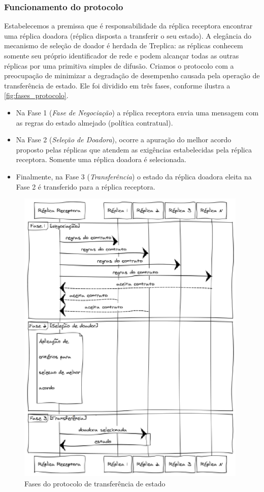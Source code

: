 \subsubsection{Funcionamento do protocolo}

Estabelecemos a premissa que é responsabilidade da réplica receptora encontrar uma réplica
doadora (réplica disposta a transferir o seu estado). A elegância do mecanismo de seleção
de doador é herdada de Treplica: as réplicas conhecem somente seu próprio identificador de
rede e podem alcançar todas as outras réplicas por uma primitiva simples de difusão.
Criamos o protocolo com a preocupação de minimizar a degradação de desempenho causada pela
operação de transferência de estado. Ele foi dividido em três fases, conforme ilustra a
\autoref{fig:fases_protocolo}.

\begin{itemize}
  \item Na Fase 1 (\emph{Fase de Negociação}) a réplica receptora envia uma mensagem com
    as regras do estado almejado (política contratual).
  \item Na Fase 2 (\emph{Seleção de Doadora}), ocorre a apuração do melhor acordo proposto
    pelas réplicas que atendem as exigências estabelecidas pela réplica receptora. Somente
    uma réplica doadora é selecionada.
  \item Finalmente, na Fase 3 (\emph{Transferência}) o estado da réplica doadora eleita na
    Fase 2 é transferido para a réplica receptora.
\end{itemize}

\begin{figure}[ht]
  \centering
  \includegraphics[width=11cm]{conteudo/capitulos/figuras/fases_protocolo.eps}
  \caption{Fases do protocolo de transferência de estado}
  \label{fig:fases_protocolo}
\end{figure}

